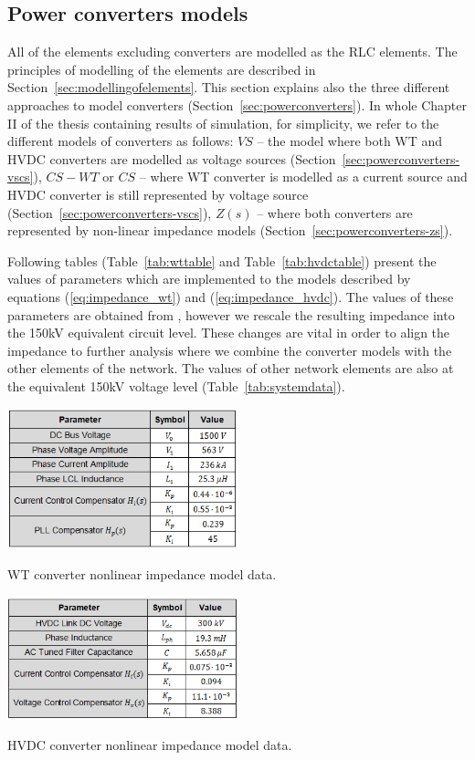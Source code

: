 \documentclass[12pt]{report} %
\begin{document}
\subsection{Power converters models} \label{sec:convertersmodels}
All of the elements excluding converters are modelled as the RLC elements. The principles of modelling of the elements are described in Section~\ref{sec:modellingofelements}. This section explains also the three different approaches to model converters (Section~\ref{sec:powerconverters}). In whole Chapter II of the thesis containing results of simulation, for simplicity, we refer to the different models of converters as follows: $VS$ – the model where both WT and HVDC converters are modelled as voltage sources (Section~\ref{sec:powerconverters-vscs}), $CS-WT$ or $CS$ – where WT converter is modelled as a current source and HVDC converter is still represented by voltage source (Section~\ref{sec:powerconverters-vscs}), $Z(s)$ – where both converters are represented by non-linear impedance models (Section~\ref{sec:powerconverters-zs}). 

Following tables (Table~\ref{tab:wttable} and Table~\ref{tab:hvdctable}) present the values of parameters which are implemented to the models described by equations (\ref{eq:impedance_wt}) and (\ref{eq:impedance_hvdc}). The values of these parameters are obtained from \cite{liusun2014}, however we rescale the resulting impedance into the 150kV equivalent circuit level. These changes are vital in order to align the impedance to further analysis where we combine the converter models with the other elements of the network. The values of other network elements are also at the equivalent 150kV voltage level (Table~\ref{tab:systemdata}).

\begin{table}[htb]
	\centering
	\includegraphics[width=0.5\textwidth]{img/tableWT.png}
  	\caption{WT converter nonlinear impedance model data.}
  	\label{tab:wttable}
\end{table}
\FloatBarrier

\begin{table}[htb]
	\centering
	\includegraphics[width=0.5\textwidth]{img/tableHVDC.png}
  	\caption{HVDC converter nonlinear impedance model data.}
  	\label{tab:hvdctable}
\end{table}
\FloatBarrier
\end{document}
